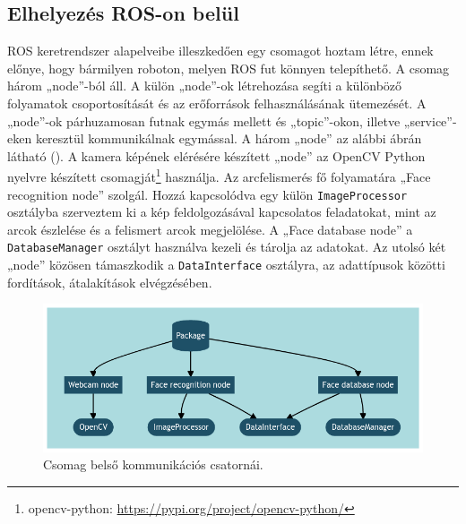 \subsection{Elhelyezés ROS-on belül}
ROS keretrendszer alapelveibe illeszkedően egy csomagot hoztam létre, ennek előnye, hogy bármilyen roboton, melyen ROS fut könnyen telepíthető. A csomag három „node”-ból áll. A külön „node”-ok létrehozása segíti a különböző folyamatok csoportosítását és az erőforrások felhasználásának ütemezését. A „node”-ok párhuzamosan futnak egymás mellett és „topic”-okon, illetve „service”-eken keresztül kommunikálnak egymással. A három „node” az alábbi ábrán látható (). A kamera képének elérésére készített „node” az OpenCV Python nyelvre készített csomagját\footnote{opencv-python: \url{https://pypi.org/project/opencv-python/}} használja. Az arcfelismerés fő folyamatára „Face recognition node” szolgál. Hozzá kapcsolódva egy külön \verb|ImageProcessor| osztályba szerveztem ki a kép feldolgozásával kapcsolatos feladatokat, mint az arcok észlelése és a felismert arcok megjelölése. A „Face database node” a \verb|DatabaseManager| osztályt használva kezeli és tárolja az adatokat. Az utolsó két „node” közösen támaszkodik a \verb|DataInterface| osztályra, az adattípusok közötti fordítások, átalakítások elvégzésében.

\begin{figure}[!ht]
    \centering
    \includegraphics[width=150mm, keepaspectratio]{02_mermaid/mermaid01_minimal.png}
    \caption{Csomag belső kommunikációs csatornái.}
    \label{fig:fullmin}
\end{figure}

\clearpage
